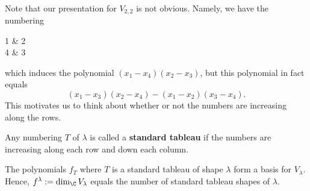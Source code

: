 \begin{ex}
\begin{enumerate}[(1)]
\begin{align*}
    \end{align*}
    Note that our presentation for $V_{2,2}$ is not obvious. Namely, we have the numbering
    \begin{center}
        \begin{ytableau}
            1 & 2 \\ 4 & 3
        \end{ytableau}
    \end{center}
which induces the polynomial $(x_1-x_4)(x_2-x_3)$, but this polynomial in fact equals
$$(x_1-x_3)(x_2-x_4)-(x_1-x_2)(x_3-x_4).$$
This motivates us to think about whether or not the numbers are increasing along the rows.
\end{enumerate}
\end{ex}

\begin{defn}
    Any numbering $T$ of $\lambda$ is called a \textbf{standard tableau} if the numbers are increasing along each row and down each column.
\end{defn}

\begin{thm}
    The polynomials $f_T$ where $T$ is a standard tableau of shape $\lambda$ form a basis for $V_\lambda$. Hence, $f^{\lambda}:=\dim_\C V_\lambda$ equals the number of standard tableau shapes of $\lambda$.
\end{thm}

